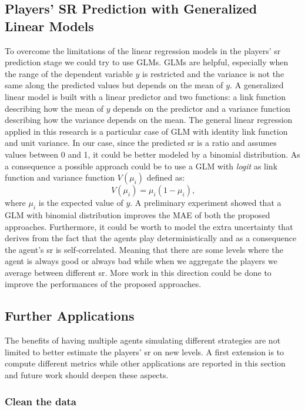 \subsection{Players' SR Prediction with Generalized Linear Models}
To overcome the limitations of the linear regression models in the players' \acs{sr} prediction stage we could try to use \acfp{GLM}. \acsp{GLM} are helpful, especially when the range of the dependent variable $y$ is restricted and the variance is not the same along the predicted values but depends on the mean of $y$. A generalized linear model is built with a linear predictor and two functions: a link function describing how the mean of $y$ depends on the predictor and a variance function describing how the variance depends on the mean. The general linear regression applied in this research is a particular case of \acs{GLM} with identity link function and unit variance. In our case, since the predicted \acs{sr} is a ratio and assumes values between 0 and 1, it could be better modeled by a binomial distribution. As a consequence a possible approach could be to use a \acs{GLM} with \textit{logit} as link function and variance function $V(\mu_i)$ defined as:
\begin{equation}
    V(\mu_i) = \mu_i(1 - \mu_i) \text{,}
\end{equation}
where $\mu_i$ is the expected value of $y$.
A preliminary experiment showed that a \acs{GLM} with binomial distribution improves the \acs{MAE} of both the proposed approaches.
Furthermore, it could be worth to model the extra uncertainty that derives from the fact that the agents play deterministically and as a consequence the agent's \acs{sr} is self-correlated. Meaning that there are some levels where the agent is always good or always bad while when we aggregate the players we average between different \acs{sr}. More work in this direction could be done to improve the performances of the proposed approaches.


\subsection{Further Applications}
The benefits of having multiple agents simulating different strategies are not limited to better estimate the players' \acs{sr} on new levels. A first extension is to compute different metrics while other applications are reported in this section and future work should deepen these aspects.

\subsubsection*{Clean the data}
 

